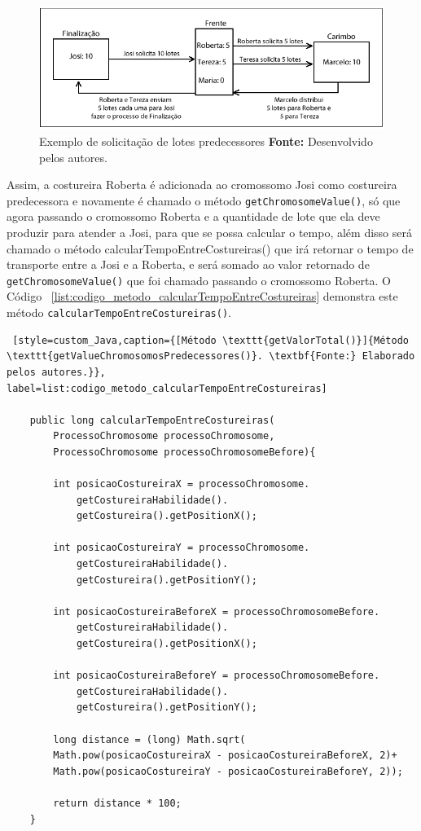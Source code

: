 \begin{figure}[h!]
	\centerline{\includegraphics[scale=1.2]{./imagens/distribuicao_exemplo_apresentacao.png}}
	\caption[Exemplo de solicitação de lotes predecessores]
	{Exemplo de solicitação de lotes predecessores
	\textbf{Fonte:} Desenvolvido pelos autores.}
	\label{fig:ex_solicitaca_lotes}
\end{figure}


\par Assim, a costureira Roberta é adicionada ao cromossomo Josi como costureira predecessora e novamente é chamado o método \texttt{getChromosomeValue()}, só que agora passando o cromossomo Roberta e a quantidade de lote que ela deve produzir para 
atender a Josi, para que se possa calcular o tempo, além disso será chamado o método calcularTempoEntreCostureiras() que irá 
retornar o tempo de transporte entre a Josi e a Roberta, e será somado ao valor retornado de \texttt{getChromosomeValue()} que  
foi chamado passando o cromossomo Roberta. O Código ~\ref{list:codigo_metodo_calcularTempoEntreCostureiras} demonstra este método \texttt{calcularTempoEntreCostureiras()}.



\begin{lstlisting} [style=custom_Java,caption={[Método \texttt{getValorTotal()}]{Método \texttt{getValueChromosomosPredecessores()}. \textbf{Fonte:} Elaborado pelos autores.}}, label=list:codigo_metodo_calcularTempoEntreCostureiras] 	

	public long calcularTempoEntreCostureiras(
		ProcessoChromosome processoChromosome,
		ProcessoChromosome processoChromosomeBefore){
		
		int posicaoCostureiraX = processoChromosome.
			getCostureiraHabilidade().
			getCostureira().getPositionX();
			
		int posicaoCostureiraY = processoChromosome.
			getCostureiraHabilidade().
			getCostureira().getPositionY();
		
		int posicaoCostureiraBeforeX = processoChromosomeBefore.
			getCostureiraHabilidade().
			getCostureira().getPositionX();
			
		int posicaoCostureiraBeforeY = processoChromosomeBefore.
			getCostureiraHabilidade().
			getCostureira().getPositionY();
		
		long distance = (long) Math.sqrt(
		Math.pow(posicaoCostureiraX - posicaoCostureiraBeforeX, 2)+
		Math.pow(posicaoCostureiraY - posicaoCostureiraBeforeY, 2));
		
		return distance * 100;
	}

\end{lstlisting}

